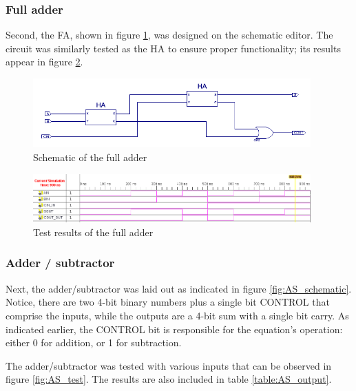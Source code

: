 \documentclass[11pt]{article}
\begin{document}
\subsubsection{Full adder}

Second, the FA, shown in figure \ref{fig:FA_schematic}, was designed on the schematic editor. The circuit was similarly tested as the HA to ensure proper functionality; its results appear in figure \ref{fig:FA_test}.

\begin{figure}[htpb]
	\centering
	\includegraphics[width=0.95\textwidth]{FA-schematic}
	\caption{Schematic of the full adder}
	\label{fig:FA_schematic}
\end{figure}

\begin{figure}[htpb]
	\centering
	\includegraphics[width=0.95\textwidth]{FA_test}
	\caption{Test results of the full adder}
	\label{fig:FA_test}
\end{figure}

\subsubsection{Adder / subtractor}

Next, the adder/subtractor was laid out as indicated in figure \ref{fig:AS_schematic}. Notice, there are two 4-bit binary numbers plus a single bit CONTROL that comprise the inputs, while the outputs are a 4-bit sum with a single bit carry. As indicated earlier, the CONTROL bit is responsible for the equation's operation: either 0 for addition, or 1 for subtraction. 

The adder/subtractor was tested with various inputs that can be observed in figure \ref{fig:AS_test}. The results are also included in table \ref{table:AS_output}.
\end{document}
